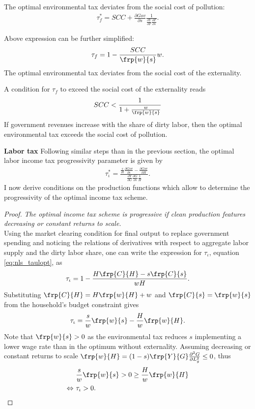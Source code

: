 The optimal environmental tax deviates from the social cost of pollution:
\begin{align}
\tau_{f}^*= SCC+\frac{\partial Gov}{\partial s}\frac{1}{\frac{\partial Y}{\partial F}\frac{\partial F}{\partial s}}.
\end{align}

Above expression can be further simplified:
\begin{align}
\tau_f = 1-\frac{SCC}{\frp{w}{s}}w. 
\end{align}
The optimal environmental tax deviates from the social cost of the externality. 

A condition for $\tau_f$ to exceed the social cost of the externality reads
\begin{align}
SCC<\frac{1}{1+\frac{w}{\frp{w}{s}}}
\end{align}
If government revenues increase with the share of dirty labor, then the optimal environmental tax exceeds the social cost of pollution. 

\textbf{Labor tax}
Following similar steps than in the previous section, the optimal labor income tax progressivity parameter is given by 
\begin{align}\label{eq:nls_taulopt}
\tau_\iota^*=\frac{\frac{s}{H}\frac{\partial Gov}{\partial s}- \frac{\partial Gov}{\partial H}}{\frac{\partial Y}{\partial G}\frac{\partial G}{\partial s}\frac{1}{H}}.
\end{align}
 I now derive conditions on the production functions which allow to determine the progressivity of the optimal income tax scheme. 
 
 \begin{proof}\textit{The optimal income tax scheme is progressive if clean production features decreasing or constant returns to scale.}
 	\\
 	Using the market clearing condition for final output to replace government spending and noticing the relations of derivatives with respect to aggregate labor supply and the dirty labor share, one can write the expression for $\tau_{\iota}$, equation \ref{eq:nls_taulopt}, as
 	\begin{align}
\tau_{\iota}=1-\frac{H\frp{C}{H}-s\frp{C}{s}}{wH}.
 	\end{align}
 	Substituting $\frp{C}{H}=H\frp{w}{H}+w$ and $\frp{C}{s}=\frp{w}{s}$ from the household's budget constraint gives
 	\begin{align}
\tau_{\iota}=\frac{s}{w}\frp{w}{s}-\frac{H}{w}\frp{w}{H}.
 	\end{align}
 	Note that $\frp{w}{s}>0$ as the environmental tax reduces $s$ implementing a lower wage rate than in the optimum without externality. Assuming decreasing or constant returns to scale $\frp{w}{H}=(1-s)\frp{Y}{G}\frac{\partial^2G}{\partial L_g^2}\leq0$, thus
 	\begin{align}
& 	\frac{s}{w}\frp{w}{s}>0\geq\frac{H}{w}\frp{w}{H}\\
 	\Leftrightarrow\ &\tau_{\iota}>0.
 	\end{align}
 \end{proof}
 
